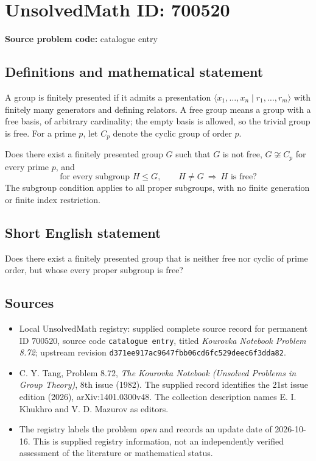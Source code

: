 \documentclass[11pt]{article}
\begin{document}
\section*{UnsolvedMath ID: 700520}
\textbf{Source problem code:} catalogue entry
\subsection{Definitions and mathematical statement}
A group is finitely presented if it admits a presentation \(\langle x_1,\ldots,x_n\mid r_1,\ldots,r_m\rangle\) with finitely many generators and defining relators. A free group means a group with a free basis, of arbitrary cardinality; the empty basis is allowed, so the trivial group is free. For a prime \(p\), let \(C_p\) denote the cyclic group of order \(p\).

Does there exist a finitely presented group \(G\) such that \(G\) is not free, \(G\not\cong C_p\) for every prime \(p\), and
\[
\text{for every subgroup }H\leq G,\qquad H\neq G\ \Longrightarrow\ H\text{ is free}?
\]
The subgroup condition applies to all proper subgroups, with no finite generation or finite index restriction.
\subsection{Short English statement}
Does there exist a finitely presented group that is neither free nor cyclic of prime order, but whose every proper subgroup is free?
\subsection{Sources}
\begin{itemize}
\item Local UnsolvedMath registry: supplied complete source record for permanent ID \(700520\), source code \texttt{catalogue entry}, titled \emph{Kourovka Notebook Problem 8.72}; upstream revision \texttt{d371ee917ac9647fbb06cd6fc529deec6f3dda82}.
\item C. Y. Tang, Problem 8.72, \emph{The Kourovka Notebook (Unsolved Problems in Group Theory)}, 8th issue (1982). The supplied record identifies the 21st issue edition (2026), arXiv:1401.0300v48. The collection description names E. I. Khukhro and V. D. Mazurov as editors.
\item The registry labels the problem \emph{open} and records an update date of 2026-10-16. This is supplied registry information, not an independently verified assessment of the literature or mathematical status.
\end{itemize}
\end{document}
